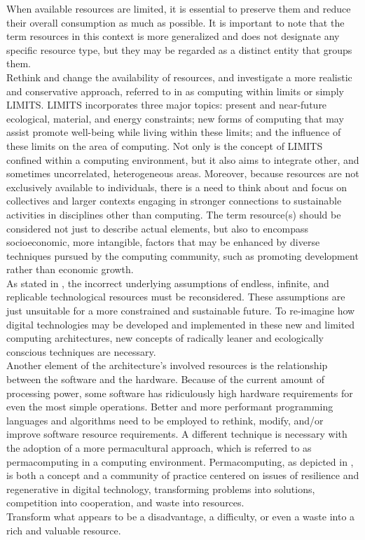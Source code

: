 When available resources are limited, it is essential to preserve them and
reduce their overall consumption as much as possible. It is important to note that
the term resources in this context is more generalized and does not designate any
specific resource type, but they may be regarded as a distinct entity that
groups them. \\ %
Rethink and change the availability of resources, and investigate a more realistic
and conservative approach, referred to in \cite{computing_within_limits} as
computing within limits or simply LIMITS. LIMITS incorporates three major topics:
present and near-future ecological, material, and energy constraints; new forms of
computing that may assist promote well-being while living within these limits;
and the influence of these limits on the area of computing. Not only is the concept
of LIMITS confined within a computing environment, but it also aims to integrate
other, and sometimes uncorrelated, heterogeneous areas. Moreover, because
resources are not exclusively available to individuals, there is a need to think
about and focus on collectives and larger contexts engaging in stronger connections
to sustainable activities in disciplines other than computing. The term resource(s)
should be considered not just to describe actual elements, but also to encompass
socioeconomic, more intangible, factors that may be enhanced by diverse
techniques pursued by the computing community, such as promoting development rather
than economic growth. \\ %
As stated in \cite{ed_tech}, the incorrect underlying assumptions of endless, infinite,
and replicable technological resources must be reconsidered. These assumptions are
just unsuitable for a more constrained and sustainable future. To re-imagine how
digital technologies may be developed and implemented in these new and limited
computing architectures, new concepts of radically leaner and ecologically conscious
techniques are necessary. \\ %
Another element of the architecture's involved resources is the relationship between
the software and the hardware. Because of the current amount of processing power,
some software has ridiculously high hardware requirements for even the most simple
operations. Better and more performant programming languages and algorithms need
to be employed to rethink, modify, and/or improve software resource requirements.
A different technique is necessary with the adoption of a more permacultural approach,
which is referred to as permacomputing in a computing environment. Permacomputing,
as depicted in \cite{permacomputing}, is both a concept and a community of practice
centered on issues of resilience and regenerative in digital technology,
transforming problems into solutions, competition into cooperation, and waste
into resources. \\ %
Transform what appears to be a disadvantage, a difficulty, or even a waste into
a rich and valuable resource.

